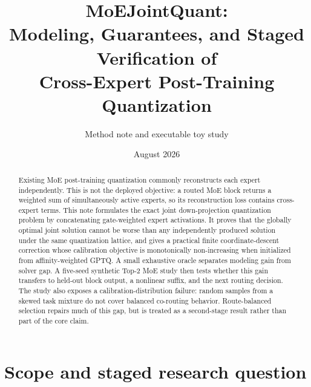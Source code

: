 \documentclass[11pt]{article}
\title{\bfseries\color{ink}MoEJointQuant:\\
Modeling, Guarantees, and Staged Verification of\\
Cross-Expert Post-Training Quantization}
\author{Method note and executable toy study}
\date{August 2026}
\theoremstyle{plain}
\theoremstyle{definition}
\theoremstyle{remark}
\begin{document}
\maketitle

\begin{center}
\end{center}

\begin{abstract}
Existing MoE post-training quantization commonly reconstructs each expert independently.  This is not the deployed objective: a routed MoE block returns a weighted sum of simultaneously active experts, so its reconstruction loss contains cross-expert terms.  This note formulates the exact joint down-projection quantization problem by concatenating gate-weighted expert activations.  It proves that the globally optimal joint solution cannot be worse than any independently produced solution under the same quantization lattice, and gives a practical finite coordinate-descent correction whose calibration objective is monotonically non-increasing when initialized from affinity-weighted GPTQ.  A small exhaustive oracle separates modeling gain from solver gap.  A five-seed synthetic Top-2 MoE study then tests whether this gain transfers to held-out block output, a nonlinear suffix, and the next routing decision.  The study also exposes a calibration-distribution failure: random samples from a skewed task mixture do not cover balanced co-routing behavior.  Route-balanced selection repairs much of this gap, but is treated as a second-stage result rather than part of the core claim.
\end{abstract}

\newpage
\setcounter{tocdepth}{1}
\tableofcontents
\newpage

\section{Scope and staged research question}
\end{document}
